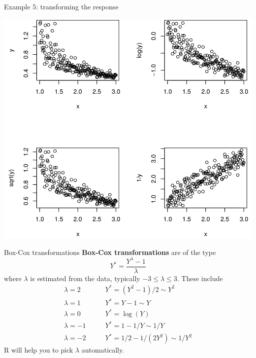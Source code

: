 \documentclass{beamer}
\begin{document}
\begin{frame}{Example 5: transforming the response}
\centerline{\includegraphics[scale=0.25]{plots/transf5}}
\end{frame}

\begin{frame}{Box-Cox transformations}
\textbf{Box-Cox transformations} are of the type
$$
Y^\ast=\frac{Y^\lambda-1}{\lambda}
$$
where $\lambda$ is estimated from the data, typically $-3\le\lambda\le3$. These include
\begin{align*}
\lambda=2\qquad &Y^\ast=(Y^2-1)/2\sim Y^2\\
\lambda=1\qquad &Y^\ast=Y-1\sim Y\\
\lambda=0\qquad &Y^\ast=\log(Y)\\
\lambda=-1\qquad &Y^\ast=1-1/Y\sim1/Y\\
\lambda=-2\qquad & Y^\ast=1/2-1/(2Y^2)\sim1/Y^2
\end{align*}
{\sc R} will help you to pick $\lambda$ automatically.
\end{frame}
\end{document}
